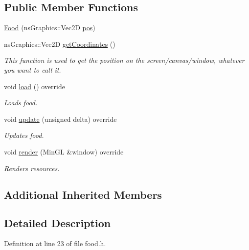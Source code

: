 \subsection*{Public Member Functions}
\begin{DoxyCompactItemize}
\item 
\hyperlink{classns_game_1_1_food_a7c7420d787be8025d23447bd24e7c2f4}{Food} (ns\+Graphics\+::\+Vec2D \hyperlink{structns_game_1_1_item_a5518876a13f3d2eda659d29748097f1a}{pos})
\item 
ns\+Graphics\+::\+Vec2D \hyperlink{classns_game_1_1_food_a65337270b0da5319663117449547118c}{get\+Coordinates} ()
\begin{DoxyCompactList}\small\item\em This function is used to get the position on the screen/canvas/window, whatever you want to call it. \end{DoxyCompactList}\item 
void \hyperlink{classns_game_1_1_food_a3d166bdb20aea5fe4ebf3c90b9c27e85}{load} () override
\begin{DoxyCompactList}\small\item\em Loads food. \end{DoxyCompactList}\item 
void \hyperlink{classns_game_1_1_food_a84b519ecca0f27b862878170e08c8731}{update} (unsigned delta) override
\begin{DoxyCompactList}\small\item\em Updates food. \end{DoxyCompactList}\item 
void \hyperlink{classns_game_1_1_food_a503e4b78c3a07ec6dbc9cfe2c79742e0}{render} (Min\+GL \&window) override
\begin{DoxyCompactList}\small\item\em Renders resources. \end{DoxyCompactList}\end{DoxyCompactItemize}
\subsection*{Additional Inherited Members}


\subsection{Detailed Description}


Definition at line 23 of file food.\+h.



